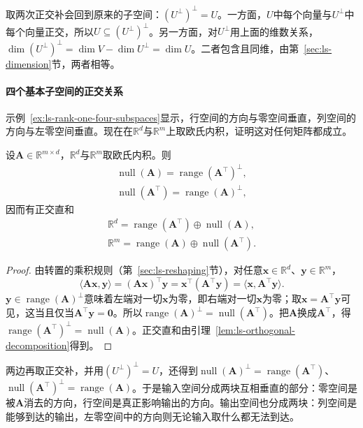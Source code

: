 取两次正交补会回到原来的子空间：$(U^\perp)^\perp=U$。一方面，$U$中每个向量与$U^\perp$中每个向量正交，所以$U\subseteq(U^\perp)^\perp$。另一方面，对$U^\perp$用上面的维数关系，$\dim(U^\perp)^\perp=\dim V-\dim U^\perp=\dim U$。二者包含且同维，由第~\ref{sec:ls-dimension}节，两者相等。

\paragraph{四个基本子空间的正交关系}
示例~\ref{ex:ls-rank-one-four-subspaces}显示，行空间的方向与零空间垂直，列空间的方向与左零空间垂直。现在在$\mathbb R^d$与$\mathbb R^m$上取欧氏内积，证明这对任何矩阵都成立。
\begin{theorem}[四个基本子空间的正交关系]
\label{thm:ls-four-subspaces-orthogonality}
设$\bm A\in\mathbb R^{m\times d}$，$\mathbb R^d$与$\mathbb R^m$取欧氏内积。则
\begin{equation}
\begin{gathered}
\operatorname{null}(\bm A)=\operatorname{range}(\bm A^\top)^\perp,\\
\operatorname{null}(\bm A^\top)=\operatorname{range}(\bm A)^\perp,
\end{gathered}
\label{eq:ls-four-subspaces-orthogonality}
\end{equation}
因而有正交直和
\begin{equation}
\begin{gathered}
\mathbb R^d=\operatorname{range}(\bm A^\top)\oplus\operatorname{null}(\bm A),\\
\mathbb R^m=\operatorname{range}(\bm A)\oplus\operatorname{null}(\bm A^\top).
\end{gathered}
\label{eq:ls-four-subspaces-decomposition}
\end{equation}
\end{theorem}
\begin{proof}
由转置的乘积规则（第~\ref{sec:ls-reshaping}节），对任意$\bm x\in\mathbb R^d$、$\bm y\in\mathbb R^m$，
\[
 \langle\bm A\bm x,\bm y\rangle=(\bm A\bm x)^\top\bm y=\bm x^\top(\bm A^\top\bm y)=\langle\bm x,\bm A^\top\bm y\rangle.
\]
$\bm y\in\operatorname{range}(\bm A)^\perp$意味着左端对一切$\bm x$为零，即右端对一切$\bm x$为零；取$\bm x=\bm A^\top\bm y$可见，这当且仅当$\bm A^\top\bm y=\bm0$。所以$\operatorname{range}(\bm A)^\perp=\operatorname{null}(\bm A^\top)$。把$\bm A$换成$\bm A^\top$，得$\operatorname{range}(\bm A^\top)^\perp=\operatorname{null}(\bm A)$。正交直和由引理~\ref{lem:ls-orthogonal-decomposition}得到。
\end{proof}
两边再取正交补，并用$(U^\perp)^\perp=U$，还得到$\operatorname{null}(\bm A)^\perp=\operatorname{range}(\bm A^\top)$、$\operatorname{null}(\bm A^\top)^\perp=\operatorname{range}(\bm A)$。于是输入空间分成两块互相垂直的部分：零空间是被$\bm A$消去的方向，行空间是真正影响输出的方向。输出空间也分成两块：列空间是能够到达的输出，左零空间中的方向则无论输入取什么都无法到达。


